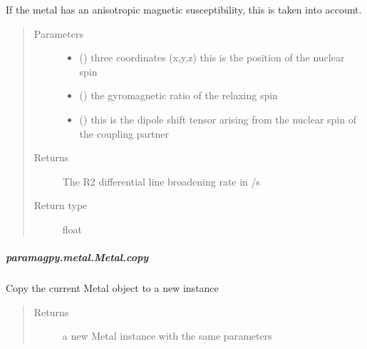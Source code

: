 \documentclass[a4paper,10pt,english,openany,oneside]{sphinxmanual}
\begin{document}
\begin{fulllineitems}
\begin{fulllineitems}
\begin{fulllineitems}
If the metal has an anisotropic magnetic susceptibility, this is
taken into account.
\begin{quote}\begin{description}
\item[{Parameters}] \leavevmode\begin{itemize}
\item {} 
 () \textendash{} three coordinates (x,y,z)
this is the position of the nuclear spin

\item {} 
 () \textendash{} the gyromagnetic ratio of the relaxing spin

\item {} 
 () \textendash{} this is the dipole shift tensor arising from
the nuclear spin of the coupling partner

\end{itemize}

\item[{Returns}] \leavevmode
{} \textendash{} The R2 differential line broadening rate in /s

\item[{Return type}] \leavevmode
float

\end{description}\end{quote}

\end{fulllineitems}



\subparagraph{paramagpy.metal.Metal.copy}
\label{\detokenize{reference/generated/paramagpy.metal.Metal.copy:paramagpy-metal-metal-copy}}\label{\detokenize{reference/generated/paramagpy.metal.Metal.copy::doc}}

\begin{fulllineitems}
\label{\detokenize{reference/generated/paramagpy.metal.Metal.copy:paramagpy.metal.Metal.copy}}
Copy the current Metal object to a new instance
\begin{quote}\begin{description}
\item[{Returns}] \leavevmode
{} \textendash{} a new Metal instance with the same parameters


\end{description}
\end{quote}
\end{fulllineitems}
\end{fulllineitems}
\end{fulllineitems}
\end{document}
